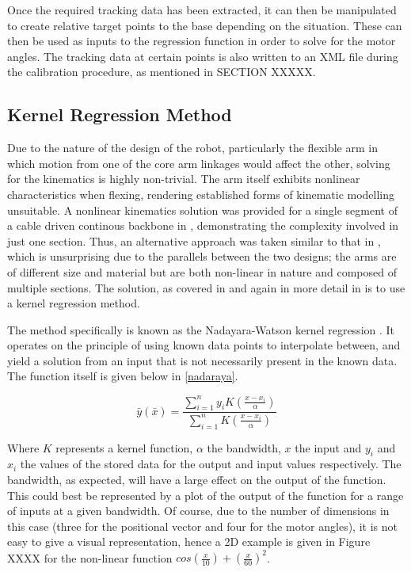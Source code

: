 \documentclass[11pt]{article}
\begin{document}
Once the required tracking data has been extracted, it can then be manipulated to create relative target points to the base depending on the situation. These can then be used as inputs to the regression function in order to solve for the motor angles. The tracking data at certain points is also written to an XML file during the calibration procedure, as mentioned in SECTION XXXXX. 

\subsection{Kernel Regression Method}
Due to the nature of the design of the robot, particularly the flexible arm in which motion from one of the core arm linkages would affect the other, solving for the kinematics is highly non-trivial. The arm itself exhibits nonlinear characteristics when flexing, rendering established forms of kinematic modelling unsuitable. A nonlinear kinematics solution was provided for a single segment of a cable driven continous backbone in \cite{li2002}, demonstrating the complexity involved in just one section. Thus, an alternative approach was taken similar to that in \cite{GreggSmithDesign}, which is unsurprising due to the parallels between the two designs; the arms are of different size and material but are both non-linear in nature and composed of multiple sections. The solution, as covered in \cite{GreggSmithDesign} and again in more detail in \cite{GreggSmithPhd} is to use a kernel regression method.

The method specifically is known as the Nadayara-Watson kernel regression \cite{nadaraya1964}. It operates on the principle of using known data points to interpolate between, and yield a solution from an input that is not necessarily present in the known data. The function itself is given below in \eqref{nadaraya}.

\begin{equation}\label{nadaraya}
\bar{y}(\bar{x}) = \frac{\sum_{i=1}^{n}y_{i}K(\frac{x - x_{i}}{\alpha})}{\sum_{i=1}^{n}K(\frac{x - x_{i}}{\alpha})}
\end{equation}

Where $K$ represents a kernel function, $\alpha$ the bandwidth, $x$ the input and $y_{i}$ and $x_{i}$ the values of the stored data for the output and input values respectively. The bandwidth, as expected, will have a large effect on the output of the function. This could best be represented by a plot of the output of the function for a range of inputs at a given bandwidth. Of course, due to the number of dimensions in this case (three for the positional vector and four for the motor angles), it is not easy to give a visual representation, hence a 2D example is given in Figure XXXX for the non-linear  function $cos(\frac{x}{10}) + (\frac{x}{60})^2$. 
\end{document}
